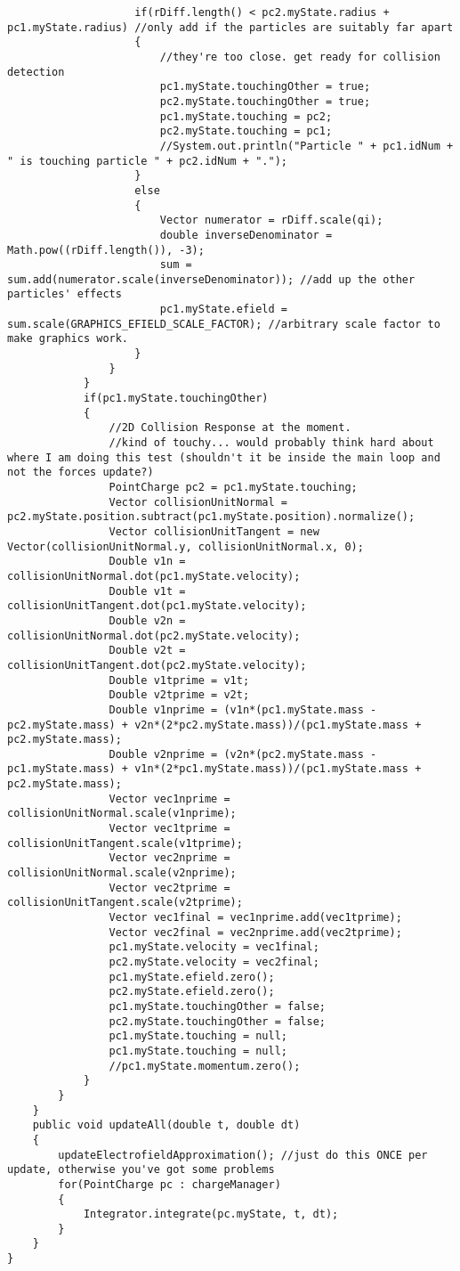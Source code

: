 \documentclass[10pt]{article}
\begin{document}
\begin{verbatim}
					if(rDiff.length() < pc2.myState.radius + pc1.myState.radius) //only add if the particles are suitably far apart
					{
						//they're too close. get ready for collision detection
						pc1.myState.touchingOther = true;
						pc2.myState.touchingOther = true;
						pc1.myState.touching = pc2;
						pc2.myState.touching = pc1;
						//System.out.println("Particle " + pc1.idNum + " is touching particle " + pc2.idNum + ".");
					}
					else
					{
						Vector numerator = rDiff.scale(qi);
						double inverseDenominator = Math.pow((rDiff.length()), -3);
						sum = sum.add(numerator.scale(inverseDenominator)); //add up the other particles' effects
						pc1.myState.efield = sum.scale(GRAPHICS_EFIELD_SCALE_FACTOR); //arbitrary scale factor to make graphics work. 
					}
				}
			}
			if(pc1.myState.touchingOther)
			{
				//2D Collision Response at the moment. 
				//kind of touchy... would probably think hard about where I am doing this test (shouldn't it be inside the main loop and not the forces update?)
				PointCharge pc2 = pc1.myState.touching;
				Vector collisionUnitNormal = pc2.myState.position.subtract(pc1.myState.position).normalize();
				Vector collisionUnitTangent = new Vector(collisionUnitNormal.y, collisionUnitNormal.x, 0);	
				Double v1n = collisionUnitNormal.dot(pc1.myState.velocity);
				Double v1t = collisionUnitTangent.dot(pc1.myState.velocity);
				Double v2n = collisionUnitNormal.dot(pc2.myState.velocity);
				Double v2t = collisionUnitTangent.dot(pc2.myState.velocity);
				Double v1tprime = v1t;
				Double v2tprime = v2t;
				Double v1nprime = (v1n*(pc1.myState.mass - pc2.myState.mass) + v2n*(2*pc2.myState.mass))/(pc1.myState.mass + pc2.myState.mass);
				Double v2nprime = (v2n*(pc2.myState.mass - pc1.myState.mass) + v1n*(2*pc1.myState.mass))/(pc1.myState.mass + pc2.myState.mass);			
				Vector vec1nprime = collisionUnitNormal.scale(v1nprime);
				Vector vec1tprime = collisionUnitTangent.scale(v1tprime);
				Vector vec2nprime = collisionUnitNormal.scale(v2nprime);
				Vector vec2tprime = collisionUnitTangent.scale(v2tprime);
				Vector vec1final = vec1nprime.add(vec1tprime);
				Vector vec2final = vec2nprime.add(vec2tprime);	
				pc1.myState.velocity = vec1final;
				pc2.myState.velocity = vec2final;
				pc1.myState.efield.zero();
				pc2.myState.efield.zero();	
				pc1.myState.touchingOther = false;
				pc2.myState.touchingOther = false;
				pc1.myState.touching = null;
				pc1.myState.touching = null;
				//pc1.myState.momentum.zero();
			}
		}
	}
	public void updateAll(double t, double dt) 
	{
		updateElectrofieldApproximation(); //just do this ONCE per update, otherwise you've got some problems
		for(PointCharge pc : chargeManager)
		{
			Integrator.integrate(pc.myState, t, dt);
		}
	}
}

\end{verbatim}
\end{document}
